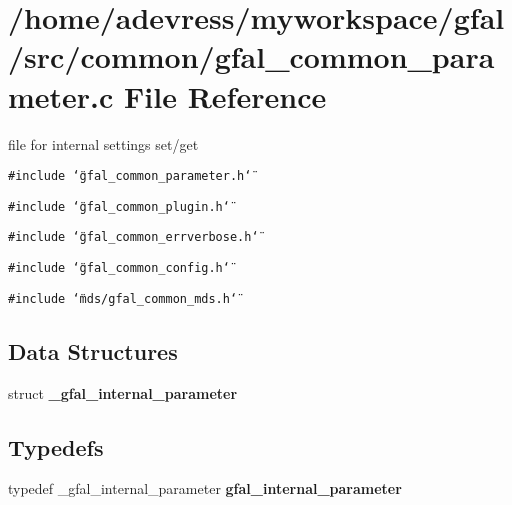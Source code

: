 \section{/home/adevress/myworkspace/gfal/src/common/gfal\_\-common\_\-parameter.c File Reference}
\label{gfal__common__parameter_8c}
file for internal settings set/get 

{\tt \#include \char`\"{}gfal\_\-common\_\-parameter.h\char`\"{}}\par
{\tt \#include \char`\"{}gfal\_\-common\_\-plugin.h\char`\"{}}\par
{\tt \#include \char`\"{}gfal\_\-common\_\-errverbose.h\char`\"{}}\par
{\tt \#include \char`\"{}gfal\_\-common\_\-config.h\char`\"{}}\par
{\tt \#include \char`\"{}mds/gfal\_\-common\_\-mds.h\char`\"{}}\par
\subsection*{Data Structures}
\begin{CompactItemize}
\item 
struct \textbf{\_\-gfal\_\-internal\_\-parameter}
\end{CompactItemize}
\subsection*{Typedefs}
\begin{CompactItemize}
\item 
typedef \_\-gfal\_\-internal\_\-parameter \textbf{gfal\_\-internal\_\-parameter}\label{gfal__common__parameter_8c_f8dc33eee75856abedd772d43bf50b51}

\end{CompactItemize}
